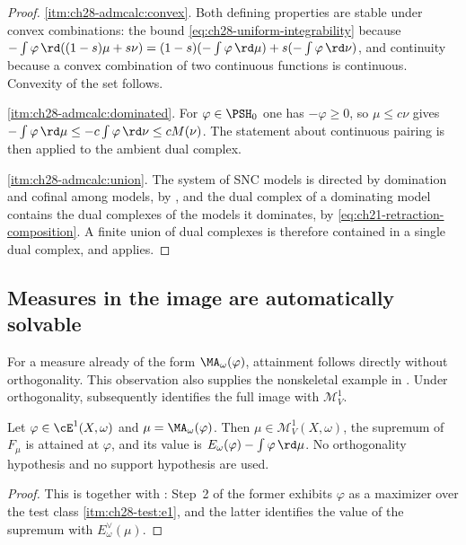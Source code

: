 \begin{proof}
\cref{itm:ch28-admcalc:convex}.  Both defining properties are stable under
convex combinations: the bound \eqref{eq:ch28-uniform-integrability} because
$-\int\varphi\,\rd((1-s)\mu+s\nu)=(1-s)(-\int\varphi\,\rd\mu)
+s(-\int\varphi\,\rd\nu)$, and continuity because a convex combination of
two continuous functions is continuous.  Convexity of the set follows.

\cref{itm:ch28-admcalc:dominated}.  For $\varphi\in\PSH_0$ one has
$-\varphi\geq0$, so $\mu\leq c\nu$ gives
$-\int\varphi\,\rd\mu\leq-c\int\varphi\,\rd\nu\leq cM(\nu)$.  The
statement about continuous pairing is then
 applied to the ambient dual complex.

\cref{itm:ch28-admcalc:union}.  The system of SNC models is directed by
domination and cofinal among models, by , and the
dual complex of a dominating model contains the dual complexes of the models
it dominates, by \eqref{eq:ch21-retraction-composition}.  A finite union of
dual complexes is therefore contained in a single dual complex, and
 applies.
\end{proof}

\subsection{Measures in the image are automatically solvable}
\label{sec:ch28-image-solvable}

For a measure already of the form $\MA_\omega(\varphi)$, attainment
follows directly without orthogonality.  This observation also supplies
the nonskeletal example in .
Under orthogonality,  subsequently
identifies the full image with $\mathcal M^1_V$.

\begin{proposition}
\label{prop:ch28-image-is-solvable}
Let $\varphi\in\cE^1(X,\omega)$ and $\mu=\MA_\omega(\varphi)$.  Then
$\mu\in\mathcal M^1_V(X,\omega)$, the supremum of $F_\mu$ is attained at
$\varphi$, and its value is
$E_\omega(\varphi)-\int\varphi\,\rd\mu$.  No orthogonality hypothesis and
no support hypothesis are used.
\end{proposition}

\begin{proof}
This is  together with
: Step~2 of the former exhibits
$\varphi$ as a maximizer over the test class
\cref{itm:ch28-test:e1}, and the latter identifies the value of the supremum
with $E^\vee_\omega(\mu)$.
\end{proof}

